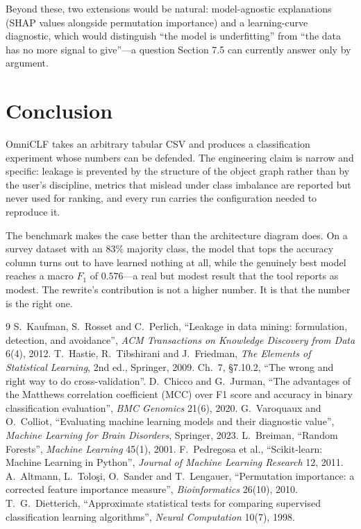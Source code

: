 \documentclass[11pt,a4paper]{article}
\begin{document}
Beyond these, two extensions would be natural: model-agnostic explanations
(SHAP values alongside permutation importance) and a learning-curve diagnostic,
which would distinguish ``the model is underfitting'' from ``the data has no
more signal to give''---a question Section 7.5 can currently answer only by
argument.

\section{Conclusion}

OmniCLF takes an arbitrary tabular CSV and produces a classification experiment
whose numbers can be defended. The engineering claim is narrow and specific:
leakage is prevented by the structure of the object graph rather than by the
user's discipline, metrics that mislead under class imbalance are reported but
never used for ranking, and every run carries the configuration needed to
reproduce it.

The benchmark makes the case better than the architecture diagram does. On a
survey dataset with an $83\%$ majority class, the model that tops the accuracy
column turns out to have learned nothing at all, while the genuinely best model
reaches a macro $F_1$ of $0.576$---a real but modest result that the tool
reports as modest. The rewrite's contribution is not a higher number. It is
that the number is the right one.

\begin{thebibliography}{9}
\small
{} S.~Kaufman, S.~Rosset and C.~Perlich, ``Leakage in data mining: formulation, detection, and avoidance'', \emph{ACM Transactions on Knowledge Discovery from Data} 6(4), 2012.
 T.~Hastie, R.~Tibshirani and J.~Friedman, \emph{The Elements of Statistical Learning}, 2nd ed., Springer, 2009. Ch.~7, \S7.10.2, ``The wrong and right way to do cross-validation''.
 D.~Chicco and G.~Jurman, ``The advantages of the Matthews correlation coefficient (MCC) over F1 score and accuracy in binary classification evaluation'', \emph{BMC Genomics} 21(6), 2020.
 G.~Varoquaux and O.~Colliot, ``Evaluating machine learning models and their diagnostic value'', \emph{Machine Learning for Brain Disorders}, Springer, 2023.
 L.~Breiman, ``Random Forests'', \emph{Machine Learning} 45(1), 2001.
 F.~Pedregosa et al., ``Scikit-learn: Machine Learning in Python'', \emph{Journal of Machine Learning Research} 12, 2011.
 A.~Altmann, L.~Tolo\c{s}i, O.~Sander and T.~Lengauer, ``Permutation importance: a corrected feature importance measure'', \emph{Bioinformatics} 26(10), 2010.
 T.~G.~Dietterich, ``Approximate statistical tests for comparing supervised classification learning algorithms'', \emph{Neural Computation} 10(7), 1998.
\end{thebibliography}
\end{document}
